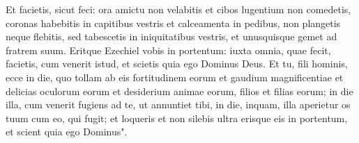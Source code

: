 \begin{biblechapter}
\verse Et facietis, sicut feci: ora amictu non velabitis et cibos lugentium non comedetis, 
\verse coronas habebitis in capitibus vestris et calceamenta in pedibus, non plangetis neque flebitis, sed tabescetis in iniquitatibus vestris, et unusquisque gemet ad fratrem suum. 
\verse Eritque Ezechiel vobis in portentum: iuxta omnia, quae fecit, facietis, cum venerit istud, et scietis quia ego Dominus Deus. 
\verse Et tu, fili hominis, ecce in die, quo tollam ab eis fortitudinem eorum et gaudium magnificentiae et delicias oculorum eorum et desiderium animae eorum, filios et filias eorum; 
\verse in die illa, cum venerit fugiens ad te, ut annuntiet tibi, 
\verse in die, inquam, illa aperietur os tuum cum eo, qui fugit; et loqueris et non silebis ultra erisque eis in portentum, et scient quia ego Dominus". 
\end{biblechapter}

